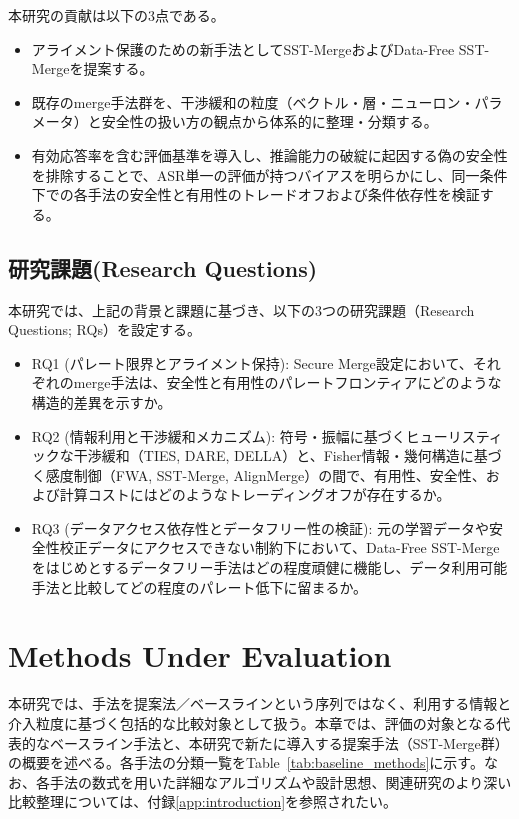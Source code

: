 \documentclass{article}
\begin{document}
本研究の貢献は以下の3点である。
\begin{itemize}
\item アライメント保護のための新手法としてSST-MergeおよびData-Free SST-Mergeを提案する。
\item 既存のmerge手法群を、干渉緩和の粒度（ベクトル・層・ニューロン・パラメータ）と安全性の扱い方の観点から体系的に整理・分類する。
\item 有効応答率を含む評価基準を導入し、推論能力の破綻に起因する偽の安全性を排除することで、ASR単一の評価が持つバイアスを明らかにし、同一条件下での各手法の安全性と有用性のトレードオフおよび条件依存性を検証する。
\end{itemize}


\subsection{研究課題(Research Questions)}
\label{gen_inst}
本研究では、上記の背景と課題に基づき、以下の3つの研究課題（Research Questions; RQs）を設定する。

\begin{itemize}
\item RQ1 (パレート限界とアライメント保持): Secure Merge設定において、それぞれのmerge手法は、安全性と有用性のパレートフロンティアにどのような構造的差異を示すか。
\item RQ2 (情報利用と干渉緩和メカニズム): 符号・振幅に基づくヒューリスティックな干渉緩和（TIES, DARE, DELLA）と、Fisher情報・幾何構造に基づく感度制御（FWA, SST-Merge, AlignMerge）の間で、有用性、安全性、および計算コストにはどのようなトレーディングオフが存在するか。
\item RQ3 (データアクセス依存性とデータフリー性の検証): 元の学習データや安全性校正データにアクセスできない制約下において、Data-Free SST-Mergeをはじめとするデータフリー手法はどの程度頑健に機能し、データ利用可能手法と比較してどの程度のパレート低下に留まるか。
\end{itemize}

\section{Methods Under Evaluation}

本研究では、手法を提案法／ベースラインという序列ではなく、利用する情報と介入粒度に基づく包括的な比較対象として扱う。本章では、評価の対象となる代表的なベースライン手法と、本研究で新たに導入する提案手法（SST-Merge群）の概要を述べる。各手法の分類一覧をTable~\ref{tab:baseline_methods}に示す。なお、各手法の数式を用いた詳細なアルゴリズムや設計思想、関連研究のより深い比較整理については、付録\ref{app:introduction}を参照されたい。
\end{document}

